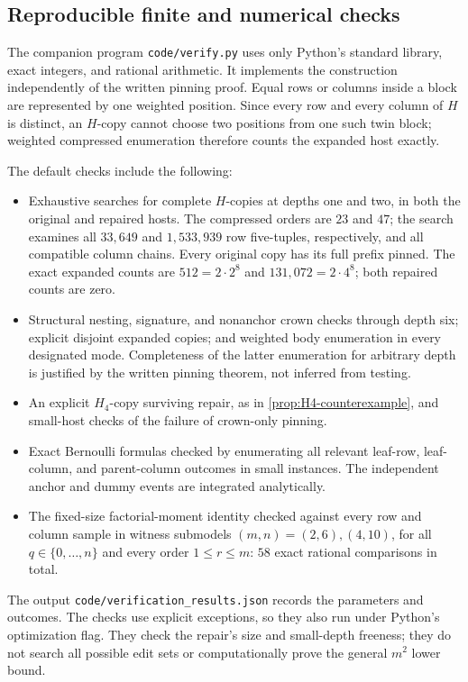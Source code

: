 \subsection{Reproducible finite and numerical checks}

The companion program \texttt{code/verify.py} uses only Python's
standard library, exact integers, and rational arithmetic. It implements
the construction independently of the written pinning proof. Equal
rows or columns inside a block are represented by one weighted
position. Since every row and every column of \(H\) is distinct,
an \(H\)-copy cannot choose two positions from one such twin block;
weighted compressed enumeration therefore counts the expanded host
exactly.

The default checks include the following:
\begin{itemize}
\item Exhaustive searches for complete \(H\)-copies at depths one and
two, in both the original and repaired hosts. The compressed orders
are \(23\) and \(47\); the search examines all \(33{,}649\) and
\(1{,}533{,}939\) row five-tuples, respectively, and all compatible
column chains. Every original copy has its full prefix pinned.
The exact expanded counts are \(512=2\cdot2^8\) and
\(131{,}072=2\cdot4^8\); both repaired counts are zero.
\item Structural nesting, signature, and nonanchor crown checks through
depth six; explicit disjoint expanded copies; and weighted body
enumeration in every designated mode. Completeness of the latter
enumeration for arbitrary depth is justified by the written pinning
theorem, not inferred from testing.
\item An explicit \(H_4\)-copy surviving repair, as in
\cref{prop:H4-counterexample}, and small-host checks of the failure
of crown-only pinning.
\item Exact Bernoulli formulas checked by enumerating all relevant
leaf-row, leaf-column, and parent-column outcomes in small instances.
The independent anchor and dummy events are integrated analytically.
\item The fixed-size factorial-moment identity checked against every
row and column sample in witness submodels \((m,n)=(2,6),(4,10)\),
for all \(q\in\{0,\ldots,n\}\) and every order \(1\le r\le m\):
\(58\) exact rational comparisons in total.
\end{itemize}

The output \texttt{code/verification\_results.json} records the
parameters and outcomes. The checks use explicit exceptions, so they
also run under Python's optimization flag. They check the repair's
size and small-depth freeness; they do not search all possible edit
sets or computationally prove the general \(m^2\) lower bound.

